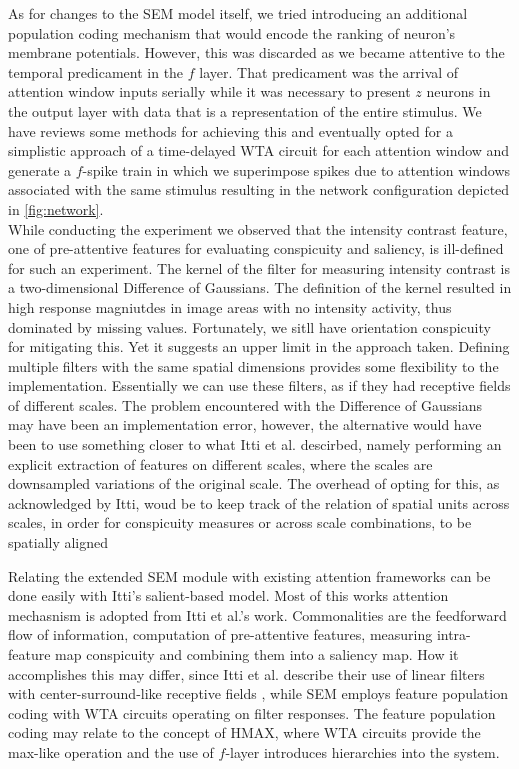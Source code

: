 \documentclass{report}
\begin{document}
As for changes to the SEM model itself, we tried introducing an additional population coding mechanism that would encode the ranking of neuron's membrane potentials. However, this was discarded as we became attentive to the temporal predicament in the $f$ layer. That predicament was the arrival of attention window inputs serially while it was necessary to present $z$ neurons in the output layer with data that is a representation of the entire stimulus. We have reviews some methods for achieving this and eventually opted for a simplistic approach of a time-delayed WTA circuit for each attention window and generate a $f$-spike train in which we superimpose spikes due to attention windows associated with the same stimulus resulting in the network configuration depicted in \cref{fig:network}.\\

While conducting the experiment we observed that the intensity contrast feature, one of pre-attentive features for evaluating conspicuity and saliency, is ill-defined for such an experiment. The kernel of the filter for measuring intensity contrast is a two-dimensional Difference of Gaussians. The definition of the kernel resulted in high response magniutdes in image areas with no intensity activity, thus dominated by missing values. Fortunately, we sitll have orientation conspicuity for mitigating this. Yet it suggests an upper limit in the approach taken. Defining multiple filters with the same spatial dimensions provides some flexibility to the implementation. Essentially we can use these filters, as if they had receptive fields of different scales. The problem encountered with the Difference of Gaussians may have been an implementation error, however, the alternative would have been to use something closer to what Itti et al. descirbed, namely performing an explicit extraction of features on different scales, where the scales are downsampled variations of the original scale. The overhead of opting for this, as acknowledged by Itti, woud be to keep track of the relation of spatial units across scales, in order for conspicuity measures or across scale combinations, to be spatially aligned \cite{Itti2000}

Relating the extended SEM module with existing attention frameworks can be done easily with Itti's salient-based model. Most of this works attention mechasnism is adopted from Itti et al.'s work. Commonalities are the feedforward flow of information, computation of pre-attentive features, measuring intra-feature map conspicuity and combining them into a saliency map. How it accomplishes this may differ, since Itti et al. describe their use of linear filters with center-surround-like receptive fields \cite{Itti2000}, while SEM employs feature population coding with WTA circuits operating on filter responses. The feature population coding may relate to the concept of HMAX, where WTA circuits provide the max-like operation and the use of $f$-layer introduces hierarchies into the system.
\end{document}
